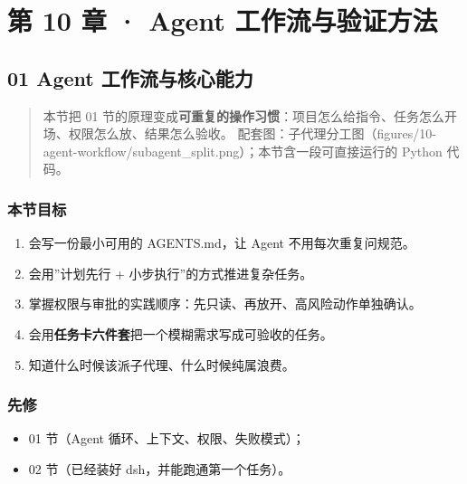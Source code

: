 \chapter{第 10 章 · Agent
工作流与验证方法}\label{ux7b2c-10-ux7ae0-agent-ux5de5ux4f5cux6d41ux4e0eux9a8cux8bc1ux65b9ux6cd5}

\section{01 Agent
工作流与核心能力}\label{agent-ux5de5ux4f5cux6d41ux4e0eux6838ux5fc3ux80fdux529b}

\begin{quote}
本节把 01
节的原理变成\textbf{可重复的操作习惯}：项目怎么给指令、任务怎么开场、权限怎么放、结果怎么验收。
配套图：子代理分工图（figures/10-agent-workflow/subagent\_split.png）；本节含一段可直接运行的
Python 代码。
\end{quote}

\subsection{本节目标}\label{ux672cux8282ux76eeux6807-33}

\begin{enumerate}
\def\labelenumi{\arabic{enumi}.}
\tightlist
\item
  会写一份最小可用的 AGENTS.md，让 Agent 不用每次重复问规范。
\item
  会用''计划先行 + 小步执行''的方式推进复杂任务。
\item
  掌握权限与审批的实践顺序：先只读、再放开、高风险动作单独确认。
\item
  会用\textbf{任务卡六件套}把一个模糊需求写成可验收的任务。
\item
  知道什么时候该派子代理、什么时候纯属浪费。
\end{enumerate}

\subsection{先修}\label{ux5148ux4fee-26}

\begin{itemize}
\tightlist
\item
  01 节（Agent 循环、上下文、权限、失败模式）；
\item
  02 节（已经装好 dsh，并能跑通第一个任务）。
\end{itemize}

